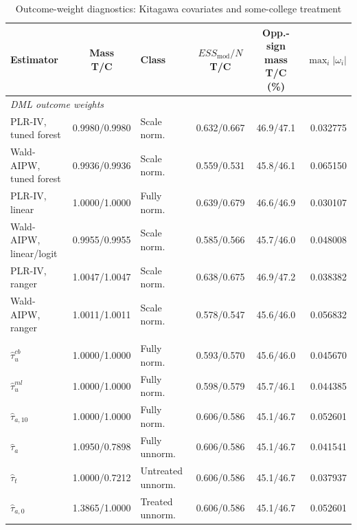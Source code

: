\documentclass[12pt, a4paper, oneside]{article}
\theoremstyle{plain}
\theoremstyle{definition}
\begin{document}
\begin{table}[H]
    \centering
    \caption{Outcome-weight diagnostics: Kitagawa covariates and some-college treatment}
    \label{tab:card_weights_kit_somecol}
    \scriptsize
    \setlength{\tabcolsep}{3pt}
    \renewcommand{\arraystretch}{0.93}
    \begin{tabular}{@{}lclccr@{}}
        \toprule
        Estimator &
        \shortstack{Mass\\T/C} &
        Class &
        \shortstack{$ESS_{\mathrm{mod}}/N$\\T/C} &
        \shortstack{Opp.-sign mass\\T/C (\%)} &
        $\max_i|\omega_i|$ \\
        \midrule
        \multicolumn{6}{l}{\textit{DML outcome weights}} \\
        PLR-IV, tuned forest
            & 0.9980/0.9980 & Scale norm.
            & 0.632/0.667 & 46.9/47.1 & 0.032775 \\
        Wald-AIPW, tuned forest
            & 0.9936/0.9936 & Scale norm.
            & 0.559/0.531 & 45.8/46.1 & 0.065150 \\
        PLR-IV, linear
            & 1.0000/1.0000 & Fully norm.
            & 0.639/0.679 & 46.6/46.9 & 0.030107 \\
        Wald-AIPW, linear/logit
            & 0.9955/0.9955 & Scale norm.
            & 0.585/0.566 & 45.7/46.0 & 0.048008 \\
        PLR-IV, ranger
            & 1.0047/1.0047 & Scale norm.
            & 0.638/0.675 & 46.9/47.2 & 0.038382 \\
        Wald-AIPW, ranger
            & 1.0011/1.0011 & Scale norm.
            & 0.578/0.547 & 45.6/46.0 & 0.056832 \\
        \addlinespace
        \multicolumn{6}{l}{\textit{Kappa outcome weights}} \\
        $\widehat{\tau}^{cb}_{u}$
            & 1.0000/1.0000 & Fully norm.
            & 0.593/0.570 & 45.6/46.0 & 0.045670 \\
        $\widehat{\tau}^{ml}_{u}$
            & 1.0000/1.0000 & Fully norm.
            & 0.598/0.579 & 45.7/46.1 & 0.044385 \\
        $\widehat{\tau}_{a,10}$
            & 1.0000/1.0000 & Fully norm.
            & 0.606/0.586 & 45.1/46.7 & 0.052601 \\
        $\widehat{\tau}_{a}$
            & 1.0950/0.7898 & Fully unnorm.
            & 0.606/0.586 & 45.1/46.7 & 0.041541 \\
        $\widehat{\tau}_{t}$
            & 1.0000/0.7212 & Untreated unnorm.
            & 0.606/0.586 & 45.1/46.7 & 0.037937 \\
        $\widehat{\tau}_{a,0}$
            & 1.3865/1.0000 & Treated unnorm.
            & 0.606/0.586 & 45.1/46.7 & 0.052601 \\
        \bottomrule
    \end{tabular}
\end{table}
\end{document}
